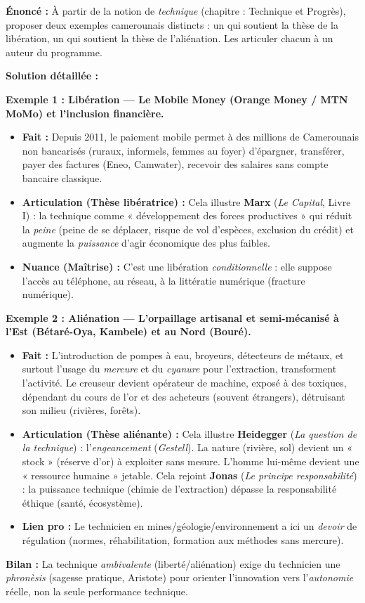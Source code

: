 \documentclass[11pt]{article}
\begin{document}
\begin{exoresolu}
\textbf{Énoncé :} À partir de la notion de \emph{technique} (chapitre : Technique et Progrès), proposer deux exemples camerounais distincts : un qui soutient la thèse de la libération, un qui soutient la thèse de l'aliénation. Les articuler chacun à un auteur du programme.

\textbf{Solution détaillée :}

\textbf{Exemple 1 : Libération — Le Mobile Money (Orange Money / MTN MoMo) et l'inclusion financière.}
\begin{itemize}
    \item \textbf{Fait :} Depuis 2011, le paiement mobile permet à des millions de Camerounais non bancarisés (ruraux, informels, femmes au foyer) d'épargner, transférer, payer des factures (Eneo, Camwater), recevoir des salaires sans compte bancaire classique.
    \item \textbf{Articulation (Thèse libératrice) :} Cela illustre \textbf{Marx} (\emph{Le Capital}, Livre I) : la technique comme « développement des forces productives » qui réduit la \emph{peine} (peine de se déplacer, risque de vol d'espèces, exclusion du crédit) et augmente la \emph{puissance} d'agir économique des plus faibles.
    \item \textbf{Nuance (Maîtrise) :} C'est une libération \emph{conditionnelle} : elle suppose l'accès au téléphone, au réseau, à la littératie numérique (fracture numérique).
\end{itemize}

\textbf{Exemple 2 : Aliénation — L'orpaillage artisanal et semi-mécanisé à l'Est (Bétaré-Oya, Kambele) et au Nord (Bouré).}
\begin{itemize}
    \item \textbf{Fait :} L'introduction de pompes à eau, broyeurs, détecteurs de métaux, et surtout l'usage du \emph{mercure} et du \emph{cyanure} pour l'extraction, transforment l'activité. Le creuseur devient opérateur de machine, exposé à des toxiques, dépendant du cours de l'or et des acheteurs (souvent étrangers), détruisant son milieu (rivières, forêts).
    \item \textbf{Articulation (Thèse aliénante) :} Cela illustre \textbf{Heidegger} (\emph{La question de la technique}) : l'\emph{engeancement} (\emph{Gestell}). La nature (rivière, sol) devient un « stock » (réserve d'or) à exploiter sans mesure. L'homme lui-même devient une « ressource humaine » jetable. Cela rejoint \textbf{Jonas} (\emph{Le principe responsabilité}) : la puissance technique (chimie de l'extraction) dépasse la responsabilité éthique (santé, écosystème).
    \item \textbf{Lien pro :} Le technicien en mines/géologie/environnement a ici un \emph{devoir} de régulation (normes, réhabilitation, formation aux méthodes sans mercure).
\end{itemize}

\textbf{Bilan :} La technique \emph{ambivalente} (liberté/aliénation) exige du technicien une \emph{phronèsis} (sagesse pratique, Aristote) pour orienter l'innovation vers l'\emph{autonomie} réelle, non la seule performance technique.
\end{exoresolu}
\end{document}
